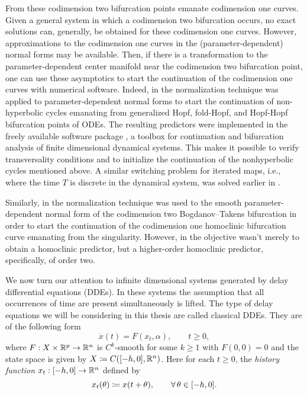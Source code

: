 From these codimension two bifurcation points emanate codimension one curves.
Given a general system in which a codimension two bifurcation occurs, no exact
solutions can, generally, be obtained for these codimension one curves.
However, approximations to the codimension one curves in the
(parameter-dependent) normal forms may be available. Then, if there is a
transformation to the parameter-dependent center manifold near the
codimension two bifurcation point, one can use these asymptotics to start
the continuation of the codimension one curves with numerical software.
Indeed, in \cite{Kuznetsov2008} the normalization technique was applied to
parameter-dependent normal forms to start the continuation of non-hyperbolic
cycles emanating from generalized Hopf, fold-Hopf, and Hopf-Hopf bifurcation
points of ODEs. The resulting predictors were implemented in the freely
available software package \MATCONT \cite{matcont1}, a \MATLAB toolbox for
continuation and bifurcation analysis of finite dimensional dynamical systems.
This makes it possible to verify transversality conditions and to initialize
the continuation of the nonhyperbolic cycles mentioned above. A similar
switching problem for iterated maps, i.e., where the time $T$ is discrete in
the dynamical system, was solved earlier in \cite{Govaerts2007maps}.

Similarly, in \cite{Kuznetsov2014improved} the normalization technique was used
to the smooth parameter-dependent normal form of the codimension two
Bogdanov--Takens bifurcation in order to start the continuation of the
codimension one homoclinic bifurcation curve emanating from the singularity.
However, in \cite{Kuznetsov2014improved} the objective wasn't merely to obtain
a homoclinic predictor, but a higher-order homoclinic predictor, specifically,
of order two. 

We now turn our attention to infinite dimensional systems generated by delay
differential equations (DDEs). In these systems the assumption that all
occurrences of time are present simultaneously is lifted. The type of delay equations
we will be considering in this thesis are called classical DDEs. They are of the
following form
\begin{equation}
    \dot{x}(t)= F(x_t, \alpha), \qquad t \ge 0,
\end{equation}
where $F: X \times \mathbb{R}^p \to \mathbb{R}^n$ is $C^k$-smooth for some $k \ge 1$ with
$F(0,0) = 0$ and the state space is given by $X \coloneqq C([-h,0],\mathbb{R}^n)$. Here for
each $t \ge 0$, the \emph{history function} $x_t : [-h,0] \to \mathbb{R}^n$ defined by
\[
  x_t(\theta) \coloneqq x(t + \theta), \qquad \forall\,\theta \in [-h,0].
\]

